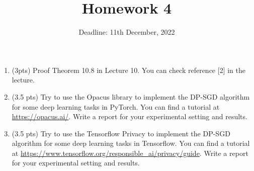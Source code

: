 \documentclass[11pt]{article}
\date{\displaydate{date}}
\begin{document}
\author{Deadline: 11th December, 2022}
\title{Homework 4}
\maketitle

\medskip
\begin{enumerate}


\item (3pts) Proof Theorem 10.8 in Lecture 10. You can check reference [2] in the lecture. 
\item (3.5 pts) Try to use the Opacus library to implement the DP-SGD algorithm for some deep learning tasks in PyTorch. You can find a tutorial at \url{https://opacus.ai/}. Write a report for your experimental setting and results. 
\item (3.5 pts) Try to use the Tensorflow Privacy to implement the DP-SGD algorithm for some deep learning tasks in Tensorflow. You can find a tutorial at \url{https://www.tensorflow.org/responsible_ai/privacy/guide}. Write a report for your experimental setting and results. 

\end{enumerate}
\end{document}
